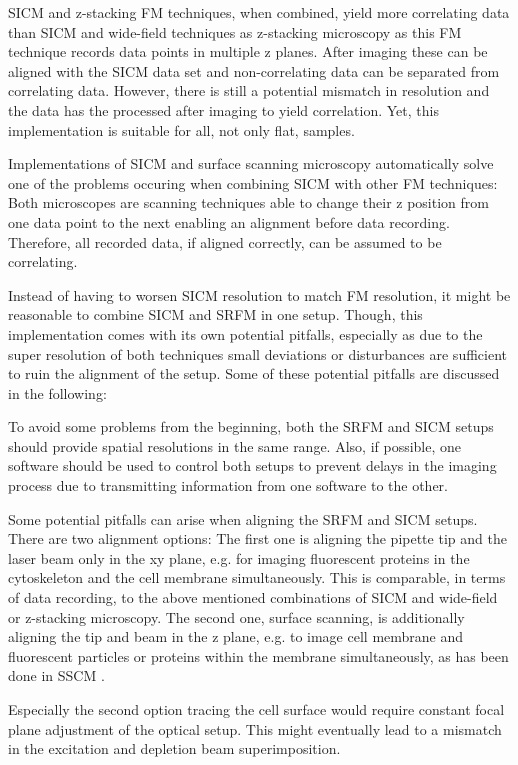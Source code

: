 SICM and z-stacking FM techniques, when combined, yield more correlating data than
SICM and wide-field techniques as z-stacking microscopy as this FM technique
records data points in multiple z planes. After imaging these can be aligned with 
the SICM data set and non-correlating data can be separated from correlating data.
However, there is still a potential mismatch in resolution and the data has the 
processed after imaging to yield correlation. Yet, this implementation is suitable
for all, not only flat, samples.

Implementations of SICM and surface scanning microscopy automatically solve one
of the problems occuring when combining SICM with other FM techniques: Both 
microscopes are scanning techniques able to change their z position from one data
point to the next enabling an alignment before data recording. Therefore, all 
recorded data, if aligned correctly, can be assumed to be correlating.

Instead of having to worsen SICM resolution to match FM resolution, it might be 
reasonable to combine SICM and SRFM in one setup. Though, this implementation
comes with its own potential pitfalls, especially as due to the super resolution
of both techniques small deviations or disturbances are sufficient to ruin the 
alignment of the setup. Some of these potential pitfalls are discussed in the 
following:

To avoid some problems from the beginning, both the SRFM and SICM setups
should provide spatial resolutions in the same range. Also, if possible, one
software should be used to control both setups to prevent delays in the
imaging process due to transmitting information from one software to the other.

Some potential pitfalls can arise when aligning the SRFM and SICM
setups. There are two alignment options: The first one is aligning the pipette
tip and the laser beam only in the xy plane, e.g. for imaging fluorescent
proteins in the cytoskeleton and the cell membrane simultaneously. This is 
comparable, in terms of data recording, to the above mentioned combinations of
SICM and wide-field or z-stacking microscopy. 
The second one, surface scanning, is additionally aligning the tip and beam
in the z plane, e.g. to image cell membrane and fluorescent particles or proteins 
within the membrane simultaneously, as has been done in 
SSCM \cite{Gorelik2002a}\cite{Shevchuk2008}.

Especially the second option tracing the cell surface would require constant
focal plane adjustment of the optical setup. This might eventually lead to a
mismatch in the excitation and depletion beam superimposition.

